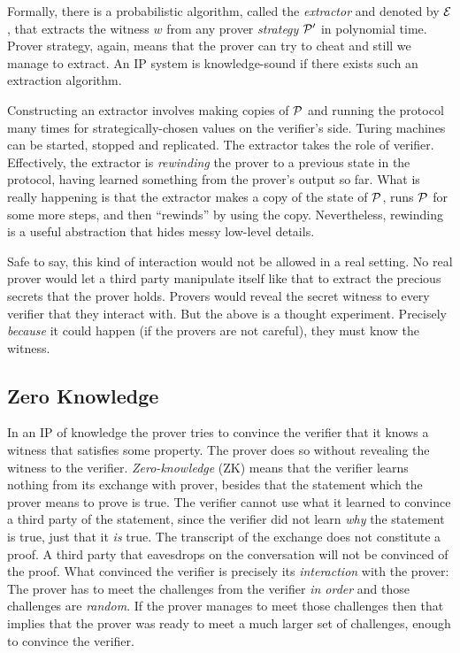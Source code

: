 Formally,
there is a probabilistic algorithm,
called the \emph{extractor} and denoted by $\mathcal{E}$,
that extracts the witness $w$ from any prover \emph{strategy} $\mathcal{P}'$ in polynomial time.
Prover strategy, again, means that the prover can try to cheat and still we manage to extract.
An IP system is knowledge-sound if there exists such an extraction algorithm.

Constructing an extractor involves making copies of $\mathcal{P}$
and running the protocol many times for strategically-chosen values on the verifier's side.
Turing machines can be started, stopped and replicated.
The extractor takes the role of verifier.
Effectively,
the extractor is \emph{rewinding} the prover to a previous state in the protocol,
having learned something from the prover's output so far.
What is really happening is that the extractor makes a copy of the state of $\mathcal{P}$,
runs $\mathcal{P}$ for some more steps,
and then \enquote{rewinds} by using the copy.
Nevertheless,
rewinding is a useful abstraction that hides messy low-level details.

Safe to say,
this kind of interaction would not be allowed in a real setting.
No real prover would let a third party manipulate itself like that
to extract the precious secrets that the prover holds.
Provers would reveal the secret witness to every verifier that they interact with.
But the above is a thought experiment.
Precisely \emph{because} it could happen (if the provers are not careful),
they must know the witness.

\subsection{Zero Knowledge}

In an IP of knowledge the prover tries to convince the verifier that it knows a witness that satisfies some property.
The prover does so without revealing the witness to the verifier.
%
\emph{Zero-knowledge} (ZK) means that the verifier learns nothing from its exchange with prover,
besides that the statement which the prover means to prove is true.
%
The verifier cannot use what it learned to convince a third party of the statement,
since the verifier did not learn \emph{why} the statement is true,
just that it \emph{is} true.
%
The transcript of the exchange does not constitute a proof.
%
A third party that eavesdrops on the conversation will not be convinced of the proof.
%
What convinced the verifier is precisely its \emph{interaction} with the prover:
The prover has to meet the challenges from the verifier \emph{in order} and those challenges are \emph{random}.
If the prover manages to meet those challenges then that implies that the prover was ready to meet a much larger set of challenges,
enough to convince the verifier.

